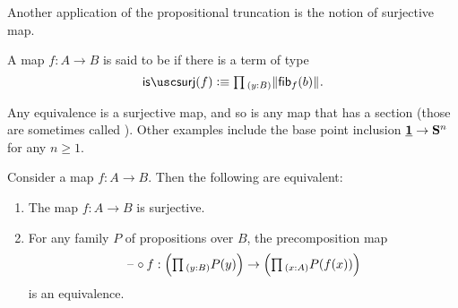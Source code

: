 Another application of the propositional truncation is the notion of surjective map.

\begin{defn}
A map $f:A\to B$ is said to be  if there is a term of type
\begin{equation*}
\issurj(f)\defeq \prd{y:B}\brck{\fib{f}{b}}.
\end{equation*}
\end{defn}

\begin{eg}
Any equivalence is a surjective map, and so is any map that has a section (those are sometimes called ). Other examples include the base point inclusion $\underline{\mathbf{1}}\to\mathbf{S}^{n}$ for any $n\geq 1$. 
\end{eg}

\begin{prp}\label{prp:surjective}
  Consider a map $f:A\to B$. Then the following are equivalent:
  \begin{enumerate}
  \item The map $f:A\to B$ is surjective.
  \item For any family $P$ of propositions over $B$, the precomposition map
    \begin{equation*}
      \blank\circ f : \Big(\prd{y:B}P(y)\Big)\to\Big(\prd{x:A}P(f(x))\Big)
    \end{equation*}
    is an equivalence.
  \end{enumerate}
\end{prp}

